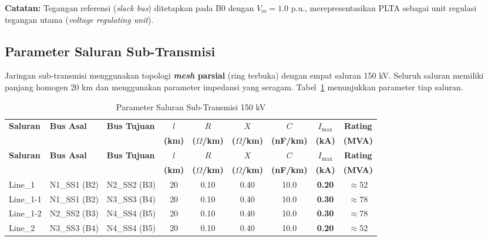 \noindent\textbf{Catatan:} Tegangan referensi (\textit{slack bus}) ditetapkan pada B0 dengan $V_m = 1{.}0$ p.u., merepresentasikan PLTA sebagai unit regulasi tegangan utama (\textit{voltage regulating unit}).

\subsection{Parameter Saluran Sub-Transmisi}
\label{subsec:Parameter_Saluran}

Jaringan sub-transmisi menggunakan topologi \textbf{\textit{mesh} parsial} (ring terbuka) dengan empat saluran 150 kV.
Seluruh saluran memiliki panjang homogen 20 km dan menggunakan parameter impedansi yang seragam.
Tabel~\ref{tab:saluran} menunjukkan parameter tiap saluran.

\begin{longtable}{|l|p{2.4cm}|p{2.4cm}|c|c|c|c|c|c|}
    \caption{Parameter Saluran Sub-Transmisi 150 kV}
    \label{tab:saluran}
    \vspace{-0.75em}\\
    \hline
    \textbf{Saluran} & \textbf{Bus Asal} & \textbf{Bus Tujuan} &
    \textbf{$l$} & \textbf{$R$} & \textbf{$X$} & \textbf{$C$} &
    \textbf{$I_{\max}$} & \textbf{Rating} \\ 
     & & & \textbf{(km)} & \textbf{($\Omega$/km)} & \textbf{($\Omega$/km)} & \textbf{(nF/km)} &
    \textbf{(kA)} & \textbf{(MVA)} \\ \hline
    \endfirsthead
    \hline
    \textbf{Saluran} & \textbf{Bus Asal} & \textbf{Bus Tujuan} &
    \textbf{$l$} & \textbf{$R$} & \textbf{$X$} & \textbf{$C$} &
    \textbf{$I_{\max}$} & \textbf{Rating} \\ 
     & & & \textbf{(km)} & \textbf{($\Omega$/km)} & \textbf{($\Omega$/km)} & \textbf{(nF/km)} &
    \textbf{(kA)} & \textbf{(MVA)} \\ \hline
    \endhead
    Line\_1   & N1\_SS1 (B2) & N2\_SS2 (B3) & 20 & 0.10 & 0.40 & 10.0 & \textbf{0.20} & $\approx$52 \\ \hline
    Line\_1-1 & N1\_SS1 (B2) & N3\_SS3 (B4) & 20 & 0.10 & 0.40 & 10.0 & \textbf{0.30} & $\approx$78 \\ \hline
    Line\_1-2 & N2\_SS2 (B3) & N4\_SS4 (B5) & 20 & 0.10 & 0.40 & 10.0 & \textbf{0.30} & $\approx$78 \\ \hline
    Line\_2   & N3\_SS3 (B4) & N4\_SS4 (B5) & 20 & 0.10 & 0.40 & 10.0 & \textbf{0.20} & $\approx$52 \\ \hline
\end{longtable}

